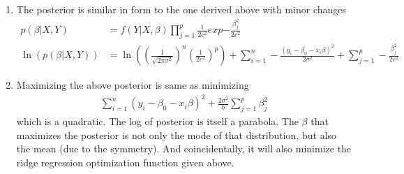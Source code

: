\documentclass[11pt, a4paper]{article}
\begin{document}
\begin{enumerate}
\begin{enumerate}
            \item The posterior is similar in form to the one derived above with minor changes
            \begin{align*}
                p(\beta|X,Y) &= f(Y|X,\beta)\prod_{j=1}^{p}\frac{1}{2c^{2}}exp{-\frac{\beta_{j}^{2}}{2c^{2}}}\\
                \ln(p(\beta|X,Y)) &= \ln((\frac{1}{\sqrt{2\pi \sigma^{2}}})^{n} (\frac{1}{2c^{2}})^{p}) + \sum_{i=1}^{n} -\frac{(y_{i}-\beta_{0}-x_{i}\beta)^{2}}{2\sigma^{2}} + \sum_{j=1}^{p} -\frac{\beta_{j}^{2}}{2c^{2}}
            \end{align*}
            \item Maximizing the above posterior is same as minimizing
            \begin{align*}
                \sum_{i=1}^{n} (y_{i}-\beta_{0}-x_{i}\beta)^{2} + \frac{2\sigma^{2}}{b}\sum_{j=1}^{p} \beta_{j}^{2}
            \end{align*}
            which is a quadratic. The log of posterior is itself a parabola. The $\beta$ that maximizes the posterior is not only the mode of that distribution, but also the mean (due to the symmetry). And coincidentally, it will also minimize the ridge regression optimization function given above.
        \end{enumerate}
    \end{enumerate}
\end{document}
